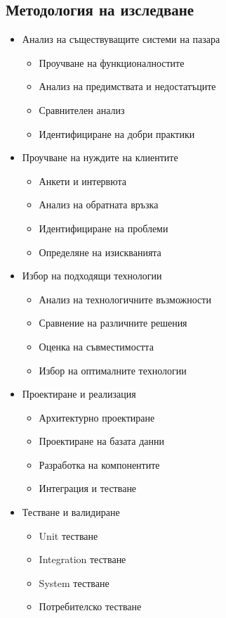 \documentclass[12pt,a4paper]{article}
\begin{document}
\subsection{Методология на изследване}
\begin{itemize}
    \item Анализ на съществуващите системи на пазара
    \begin{itemize}
        \item Проучване на функционалностите
        \item Анализ на предимствата и недостатъците
        \item Сравнителен анализ
        \item Идентифициране на добри практики
    \end{itemize}
    
    \item Проучване на нуждите на клиентите
    \begin{itemize}
        \item Анкети и интервюта
        \item Анализ на обратната връзка
        \item Идентифициране на проблеми
        \item Определяне на изискванията
    \end{itemize}
    
    \item Избор на подходящи технологии
    \begin{itemize}
        \item Анализ на технологичните възможности
        \item Сравнение на различните решения
        \item Оценка на съвместимостта
        \item Избор на оптималните технологии
    \end{itemize}
    
    \item Проектиране и реализация
    \begin{itemize}
        \item Архитектурно проектиране
        \item Проектиране на базата данни
        \item Разработка на компонентите
        \item Интеграция и тестване
    \end{itemize}
    
    \item Тестване и валидиране
    \begin{itemize}
        \item Unit тестване
        \item Integration тестване
        \item System тестване
        \item Потребителско тестване
    \end{itemize}
\end{itemize}
\end{document}
